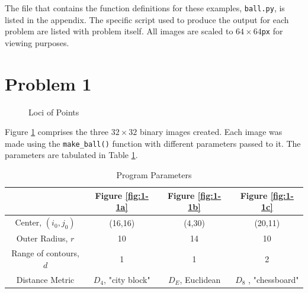 \documentclass[aps,letterpaper,10pt]{article}
\begin{document}
The file that contains the function definitions for these examples, \texttt{ball.py}, is listed in the appendix.  The specific script used to produce the output for each problem are listed with problem itself.  All images are scaled to $64\times64$\texttt{px} for viewing purposes.
\section{Problem 1}
\begin{figure}[!h]
\centering
{}\hfill
{}\hfill
{}
\caption{Loci of Points}
\label{1-1}
\end{figure}

Figure \ref{1-1} comprises the three $32\times32$ binary images created.  Each image was made using the \texttt{make\_ball()} function with different parameters passed to it. The parameters are tabulated in Table \ref{table:1-1}.\\
\begin{table}[!h]
\centering
\begin{tabular}{|c|c|c|c|}
\hline
& Figure \ref{fig:1-1a} & Figure \ref{fig:1-1b} & Figure \ref{fig:1-1c} \\
\hline
Center, $(i_0,j_0)$ & (16,16) & (4,30) & (20,11) \\
\hline
Outer Radius, $r$ & 10 & 14 & 10 \\
\hline
Range of contours, $d$ & 1 & 1 & 2 \\
\hline
Distance Metric & $D_4$, "city block" & $D_E$, Euclidean & $D_8$ , "chessboard" \\
\hline
\end{tabular}
\caption{Program Parameters}
\label{table:1-1}
\end{table}
\end{document}
